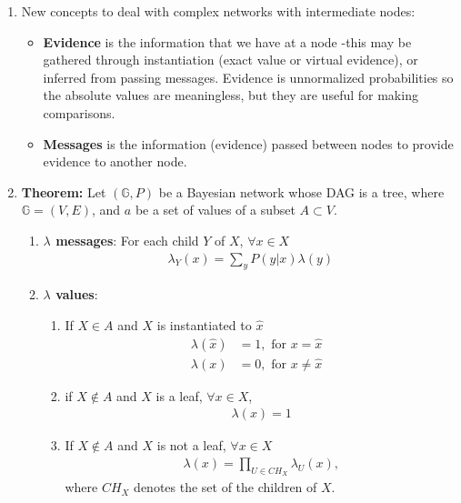 \documentclass[12pt,twoside]{article}
\begin{document}
\begin{enumerate}
\item New concepts to deal with complex networks with intermediate nodes:
\begin{itemize}
\item \textbf{Evidence} is the information that we have at a node -this may be gathered through instantiation (exact value or virtual evidence), or inferred from passing messages. Evidence is unnormalized probabilities so the absolute values are meaningless, but they are useful for making comparisons.
\item \textbf{Messages} is the information (evidence) passed between nodes to provide evidence to another node.
\end{itemize}



\item \textbf{Theorem:} Let $(\mathbb{G}, P)$ be a Bayesian network whose DAG is a tree, where $\mathbb{G} = (V,E)$, and $a$ be a set of values of a subset $A\subset V$. 
\begin{enumerate}
\item \textbf{$\lambda$ messages}: For each child $Y$ of $X$, $\forall x \in X$
\begin{align*}
\lambda_Y(x) = \sum_y P(y\vert x)\lambda(y)
\end{align*}

\item \textbf{$\lambda$ values}: 
\begin{enumerate}
\item If $X\in A$ and $X$ is instantiated to $\hat{x}$
\begin{align*}
\lambda(\hat{x})& = 1,		\text{ for } x = \hat{x}&\\
\lambda(x) & = 0,				\text{ for } x\neq \hat{x}&
\end{align*}

\item if $X \notin A$ and $X$ is a leaf, $\forall x \in X$, 
\begin{align*}
\lambda(x) = 1
\end{align*}

\item If $X \notin A$ and $X$ is not a leaf, $\forall x \in X$
\begin{align*}
\lambda(x) = \prod_{U\in CH_X} \lambda_U (x),
\end{align*}
where $CH_X$ denotes the set of the children of $X$.
\end{enumerate}


\end{enumerate}
\end{enumerate}
\end{document}

